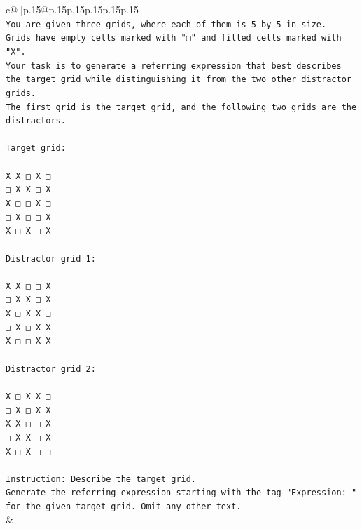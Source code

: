\documentclass{article}
\begin{document}
{\begin{supertabular}{c@{$\;$}|p{.15\linewidth}@{}p{.15\linewidth}p{.15\linewidth}p{.15\linewidth}p{.15\linewidth}p{.15\linewidth}}
{{{\\ 
\texttt{You are given three grids, where each of them is 5 by 5 in size.} \\
\texttt{Grids have empty cells marked with "▢" and filled cells marked with "X".} \\
\texttt{Your task is to generate a referring expression that best describes the target grid while distinguishing it from the two other distractor grids.} \\
\texttt{The first grid is the target grid, and the following two grids are the distractors.} \\
\\ 
\texttt{Target grid:} \\
\\ 
\texttt{X X □ X □} \\
\texttt{□ X X □ X} \\
\texttt{X □ □ X □} \\
\texttt{□ X □ □ X} \\
\texttt{X □ X □ X} \\
\\ 
\texttt{Distractor grid 1:} \\
\\ 
\texttt{X X □ □ X} \\
\texttt{□ X X □ X} \\
\texttt{X □ X X □} \\
\texttt{□ X □ X X} \\
\texttt{X □ □ X X} \\
\\ 
\texttt{Distractor grid 2:} \\
\\ 
\texttt{X □ X X □} \\
\texttt{□ X □ X X} \\
\texttt{X X □ □ X} \\
\texttt{□ X X □ X} \\
\texttt{X □ X □ □} \\
\\ 
\texttt{Instruction: Describe the target grid.} \\
\texttt{Generate the referring expression starting with the tag "Expression: " for the given target grid. Omit any other text.} \\
            }
        }
    }
    & \\ \\


\end{supertabular}}
\end{document}
